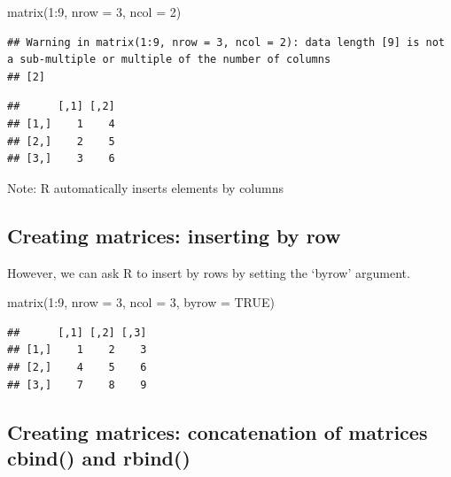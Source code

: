 \documentclass[
  11pt,
]{book}
\newenvironment{Shaded}{\begin{snugshade}}{\end{snugshade}}
\newcommand{\AttributeTok}[1]{\textcolor[rgb]{0.77,0.63,0.00}{#1}}
\newcommand{\ConstantTok}[1]{\textcolor[rgb]{0.00,0.00,0.00}{#1}}
\newcommand{\DecValTok}[1]{\textcolor[rgb]{0.00,0.00,0.81}{#1}}
\newcommand{\FunctionTok}[1]{\textcolor[rgb]{0.00,0.00,0.00}{#1}}
\newcommand{\NormalTok}[1]{#1}
\newcommand{\SpecialCharTok}[1]{\textcolor[rgb]{0.00,0.00,0.00}{#1}}
\begin{document}
\begin{Shaded}
\begin{Highlighting}[]
\FunctionTok{matrix}\NormalTok{(}\DecValTok{1}\SpecialCharTok{:}\DecValTok{9}\NormalTok{, }\AttributeTok{nrow =} \DecValTok{3}\NormalTok{, }\AttributeTok{ncol =} \DecValTok{2}\NormalTok{)}
\end{Highlighting}
\end{Shaded}

\begin{verbatim}
## Warning in matrix(1:9, nrow = 3, ncol = 2): data length [9] is not a sub-multiple or multiple of the number of columns
## [2]
\end{verbatim}

\begin{verbatim}
##      [,1] [,2]
## [1,]    1    4
## [2,]    2    5
## [3,]    3    6
\end{verbatim}

Note: R automatically inserts elements by columns

\hypertarget{creating-matrices-inserting-by-row}{%
\subsection{Creating matrices: inserting by row}\label{creating-matrices-inserting-by-row}}

However, we can ask R to insert by rows by setting the `byrow' argument.

\begin{Shaded}
\begin{Highlighting}[]
\FunctionTok{matrix}\NormalTok{(}\DecValTok{1}\SpecialCharTok{:}\DecValTok{9}\NormalTok{, }\AttributeTok{nrow =} \DecValTok{3}\NormalTok{, }\AttributeTok{ncol =} \DecValTok{3}\NormalTok{, }\AttributeTok{byrow =} \ConstantTok{TRUE}\NormalTok{)}
\end{Highlighting}
\end{Shaded}

\begin{verbatim}
##      [,1] [,2] [,3]
## [1,]    1    2    3
## [2,]    4    5    6
## [3,]    7    8    9
\end{verbatim}

\hypertarget{creating-matrices-concatenation-of-matrices-cbind-and-rbind}{%
\subsection{Creating matrices: concatenation of matrices cbind() and rbind()}\label{creating-matrices-concatenation-of-matrices-cbind-and-rbind}}
\end{document}
